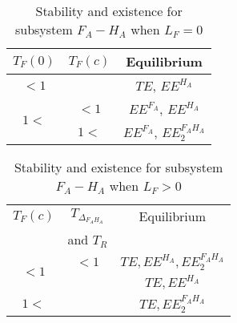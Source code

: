 \documentclass{article}
\begin{document}
\begin{table}[!ht]
\centering
\caption{\centering Stability and existence for subsystem $F_A-H_A$ when $L_F = 0$}
\begin{tabular}{c|c|c}
$T_F(0)$  & $T_F(c)$ & Equilibrium \\
\hline
 $<1$ & &  $TE$, $EE^{H_A}$ \\
\cline{1-3}
  \multirow{2}{*}{$1<$}  & $<1$&  $EE^{F_A}$, $EE^{H_A}$ \\
& $1<$ & $EE^{F_A}$, $EE^{F_AH_A}_2$ \\
\hline
\end{tabular}
\end{table}
%

\begin{table}[!ht]
\centering
\caption{\centering Stability and existence for subsystem $F_A-H_A$ when $L_F > 0$}
\begin{tabular}{c|c|c}
 $T_F(c)$ & $T_{\Delta_{F_AH_A}}$  & Equilibrium \\
 & and $T_R$ &  \\
\hline
 \multirow{2}{*}{$<1$} &$<1$& $TE, EE^{H_A}, EE^{F_AH_A}_2$ \\
 & & $TE, EE^{H_A}$ \\
 \cline{1-3}
$1<$ & & $TE, EE^{F_AH_A}_2$ \\
\hline
\end{tabular}
\end{table}
\end{document}
